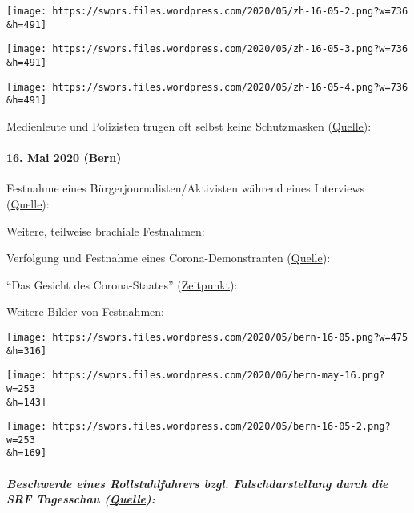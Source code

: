 \texttt{[image: https://swprs.files.wordpress.com/2020/05/zh-16-05-2.png?w=736\\\&h=491]}

\texttt{[image: https://swprs.files.wordpress.com/2020/05/zh-16-05-3.png?w=736\\\&h=491]}

\texttt{[image: https://swprs.files.wordpress.com/2020/05/zh-16-05-4.png?w=736\\\&h=491]}

Medienleute und Polizisten trugen oft selbst keine Schutzmasken
(\href{https://www.youtube.com/watch?v=yAddXOWeUes}{Quelle}):

\hypertarget{16-mai-2020-bern}{%
\paragraph{16. Mai 2020 (Bern)}\label{16-mai-2020-bern}}

Festnahme eines Bürgerjournalisten/Aktivisten während eines Interviews
(\href{https://www.youtube.com/watch?v=rSY0adx_Ua8}{Quelle}):

Weitere, teilweise brachiale Festnahmen:

Verfolgung und Festnahme eines Corona-Demonstranten
(\href{https://www.youtube.com/watch?v=Nx8Mn0dV2Qo}{Quelle}):

``Das Gesicht des Corona-Staates''
(\href{https://www.zeitpunkt.ch/der-corona-staat-zeigt-sein-gesicht}{Zeitpunkt}):

Weitere Bilder von Festnahmen:

\href{https://swprs.org/corona-repression-in-der-schweiz/bern-16-05/}{}

\texttt{[image: https://swprs.files.wordpress.com/2020/05/bern-16-05.png?w=475\\\&h=316]}

\href{https://swprs.org/corona-repression-in-der-schweiz/bern-may-16/}{}

\texttt{[image: https://swprs.files.wordpress.com/2020/06/bern-may-16.png?w=253\\\&h=143]}

\href{https://swprs.org/corona-repression-in-der-schweiz/bern-16-05-2/}{}

\texttt{[image: https://swprs.files.wordpress.com/2020/05/bern-16-05-2.png?w=253\\\&h=169]}

\hypertarget{beschwerde-eines-rollstuhlfahrers-bzgl-falschdarstellung-durch-die-srf-tagesschau-quelle}{%
\subparagraph{\texorpdfstring{Beschwerde eines Rollstuhlfahrers bzgl.
Falschdarstellung durch die SRF Tagesschau
(\href{https://www.youtube.com/watch?v=9BA83YQT7AE}{Quelle}):}{Beschwerde eines Rollstuhlfahrers bzgl. Falschdarstellung durch die SRF Tagesschau (Quelle):}}\label{beschwerde-eines-rollstuhlfahrers-bzgl-falschdarstellung-durch-die-srf-tagesschau-quelle}}

